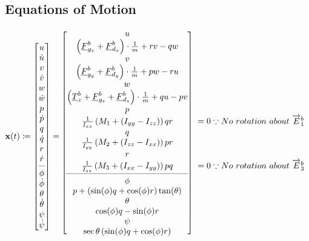 \subsection{Equations of Motion}
\[
\mstate \coloneqq\begin{bmatrix}
u\\\dot{u}\\v\\\dot{v}\\w\\\dot{w}\\
p\\\dot{p}\\q\\\dot{q}\\r\\\dot{r}\\
\cmidrule(lr){1-1}
\phi\\\dot{\phi}\\\theta\\\dot{\theta}\\\psi\\\dot{\psi}
\end{bmatrix}=\begin{blockarray}{cl}
\begin{block}{[c]l}
u&\\\left(\colvec{F}_{g_x}^b+\colvec{F}_{d_x}^b\right)\cdot\frac{1}{m}+rv-qw&\\
v&\\\left(\colvec{F}_{g_y}^b+\colvec{F}_{d_y}^b\right)\cdot\frac{1}{m}+pw-ru&\\
w&\\\left(\colvec{T}^b_z+\colvec{F}_{g_z}^b+\colvec{F}_{d_z}^b\right)\cdot\frac{1}{m}+qu-pv&\\
p&\\\frac{1}{I_{xx}}\left(M_1+(I_{yy}-I_{zz})\right)qr&\mLabel{=0\because No\ rotation\ about\ \maxis{b}{1}}\\
q&\\\frac{1}{I_{yy}}\left(M_2+\left(I_{zz}-I_{xx}\right)\right)pr&\\
r&\\\frac{1}{I_{zz}}\left(M_3+\left(I_{xx}-I_{yy}\right)\right)pq&\mLabel{=0 \because No\ rotation\ about\ \maxis{b}{3}}\\
\cmidrule(lr){1-1}
\phi&\\p+\left(\sin(\phi)q+\cos(\phi)r\right)\tan(\theta)&\\
\theta&\\\cos(\phi)q-\sin(\phi)r&\\
\psi&\\\sec{\theta}\left(\sin(\phi)q+\cos(\phi)r\right)&\\
\end{block}
\end{blockarray}
\]
